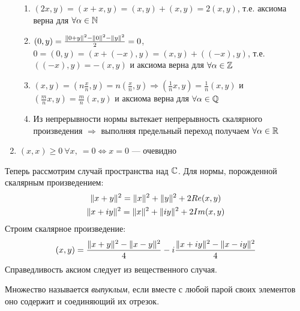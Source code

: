 \begin{proofocre}
\begin{enumerate}
\begin{enumerate}
        \item $(2x, y) = (x + x, y) = (x, y) + (x, y) = 2(x, y)$, т.е. аксиома верна для $\forall \alpha\in{\mathbb{N}}$
        \item $(0, y) = \frac{\|0 + y\|^2 - \|0\|^2 - \|y\|^2}{2} = 0$,\\
        $0 = (0, y) = (x + (-x), y) = (x, y) + ((-x), y)$, т.е. $((-x), y) = -(x,y)$ и аксиома верна для $\forall\alpha\in{\mathbb{Z}}$
        \item $(x, y) = (n\frac{x}{n}, y) = n(\frac{x}{n}, y) \Rightarrow (\frac{1}{n}x, y) = \frac{1}{n}(x, y)$ и $(\frac{m}{n}x, y) = \frac{m}{n}(x, y)$ и аксиома верна для $\forall\alpha\in{\mathbb{Q}}$
        \item Из непрерывности нормы вытекает непрерывность скалярного произведения $\Rightarrow$ выполняя предельный переход получаем $\forall\alpha\in{\mathbb{R}}$
    \end{enumerate}
    \item $(x,x)\ge 0~\forall x,~=0 \Leftrightarrow x = 0$ --- очевидно
\end{enumerate}
Теперь рассмотрим случай пространства над ${\mathbb{C}}$.
Для нормы, порожденной скалярным произведением:
\begin{gather*}
    \|x + y\|^2 = \|x\|^2 + \|y\|^2 + 2Re(x, y)\\
    \|x + iy\|^2 = \|x\|^2 + \|iy\|^2 + 2Im(x,y)
\end{gather*}
Строим скалярное произведение:
$$(x, y) = \frac{\|x + y\|^2 - \|x - y\|^2}{4} - i\frac{\|x + iy\|^2 - \|x - iy\|^2}{4}$$
Справедливость аксиом следует из вещественного случая.
\end{proofocre}


\begin{definition}
Множество называется \emph{выпуклым}, если вместе с любой парой своих элементов оно содержит и соединяющий их отрезок.
\end{definition}

